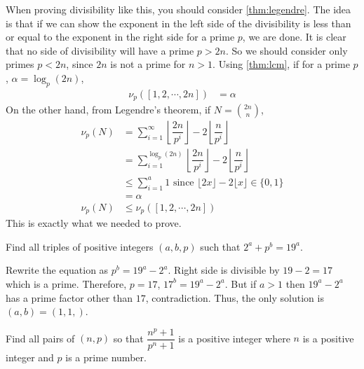 \documentclass[problems.tex]{subfile}
\begin{document}
	\begin{solution}
		When proving divisibility like this, you should consider \autoref{thm:legendre}. The idea is that if we can show the exponent in the left side of the divisibility is less than or equal to the exponent in the right side for a prime $p$, we are done. It is clear that no side of divisibility will have a prime $p>2n$. So we should consider only primes $p<2n$, since $2n$ is not a prime for $n>1$. Using \autoref{thm:lcm}, if for a prime $p$, $\alpha =\log_p(2n)$,
			\begin{align*}
				\nu_p([1,2,\cdots,2n]) & = \alpha
			\end{align*}
		On the other hand, from Legendre's theorem, if $N=\binom{2n}n$,
			\begin{align*}
				\nu_p(N) & = \sum_{i=1}^{\infty}\left\lfloor\dfrac{2n}{p^i}\right\rfloor-2\left\lfloor\dfrac{n}{p^i}\right\rfloor\\
						 & = \sum_{i=1}^{\log_{p}(2n)}\left\lfloor\dfrac{2n}{p^i}\right\rfloor-2\left\lfloor\dfrac{n}{p^i}\right\rfloor\\
						 &\leq\sum_{i=1}^{a}1\text { since }\lfloor2x\rfloor-2\lfloor x\rfloor\in\{0,1\}\\
						 & = \alpha \\
				\nu_p(N) &\leq\nu_p([1,2,\cdots,2n])
			\end{align*}
		This is exactly what we needed to prove.
	\end{solution}

	\begin{problem}
		Find all triples of positive integers $(a, b, p)$ such that $2^a+p^b=19^a$.
	\end{problem}

	\begin{solution}
		Rewrite the equation as $p^b=19^a-2^a$. Right side is divisible by $19-2=17$ which is a prime. Therefore, $p=17$, $17^b=19^a-2^a$. But if $a>1$ then $19^a-2^a$ has a prime factor other than $17$, contradiction. Thus, the only solution is $(a,b)=(1,1,)$.
	\end{solution}


	\begin{problem}
		Find all pairs of $(n, p)$ so that $\dfrac{n^p+1}{p^n+1}$ is a positive integer where $n$ is a positive integer and $p$ is a prime number.
	\end{problem}
\end{document}
